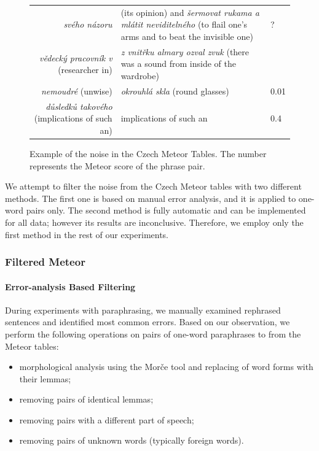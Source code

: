 \begin{figure}[tb]
\begin{center}

	  \begin{tabular}{rll}
  	\textit{svého názoru}  & (its opinion) and \textit{šermovat rukama a mlátit neviditelného} (to flail one's arms and to beat the invisible one) & ?\\
  	\textit{vědecký pracovník v} (researcher in)  & \textit{z vnitřku almary ozval zvuk} (there was a sound from inside of the wardrobe) & \\
    \textit{nemoudré} (unwise) & \textit{okrouhlá skla} (round glasses) & 0.01\\
   	\textit{důsledků takového} (implications of such an) & implications of such an & 0.4\\ 
   	\end{tabular}

\caption{Example of the noise in the Czech Meteor Tables. The number represents the Meteor score of the phrase pair.}
\label{meteor_noise}
\end{center}
\end{figure}

We attempt to filter the noise from the Czech Meteor tables with two different methods. 
The first one is based on manual error analysis, and it is applied to one-word pairs only. 
The second method is fully automatic and can be implemented for all data; however its results are inconclusive. 
Therefore, we employ only the first method in the rest of our experiments.

\subsubsection{Filtered Meteor} 

\paragraph{Error-analysis Based Filtering}
During experiments with paraphrasing, we manually examined rephrased sentences and identified most common errors.
Based on our observation, we perform the following operations on pairs of one-word paraphrases to from the Meteor tables:

\begin{itemize}
\item morphological analysis using the Morče tool \citep{morce:2007} and replacing of word forms with their lemmas; 
\item removing pairs of identical lemmas;
\item removing pairs with a different part of speech;
\item removing pairs of unknown words (typically foreign words).
\end{itemize}

